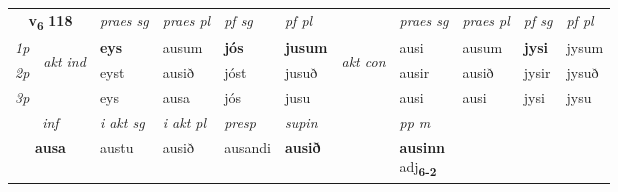 \noindent
\begin{tabular}{lllllllllll} \toprule
\multicolumn{2}{c}{\textbf{v{\textsubscript{6}}} \Large{\textbf{118}}}  &  \textit{praes sg}  & \textit{praes pl}  &\textit{ pf sg} & \textit{pf pl} &  &  \textit{praes sg}  & \textit{praes pl}  & \textit{pf sg} & \textit{pf pl } \\*
	\cmidrule{3-6} \cmidrule{8-11}
 {\textit{1p}} & \multirow{3}{*}{\begin{turn}{90}\textit{akt ind}\end{turn}} & \textbf{eys} & ausum & \textbf{jós} & \textbf{jusum} & \multirow{3}{*}{\begin{turn}{90}\textit{akt con}\end{turn}} &ausi & ausum & \textbf{jysi} & jysum\\*
 {\textit{2p}} &  &  eyst  & ausið & jóst & jusuð & & ausir & ausið & jysir & jysuð \\*
{\textit{3p}} &  & eys & ausa & jós & jusu & & ausi & ausi& jysi & jysu \\*
\cmidrule{3-6} \cmidrule{8-11}

   \multicolumn{2}{c}{\textit{inf}}  & \textit{i akt sg} & \textit{i akt pl}   & \textit{presp} & \textit{supin}  && \textit{pp m} \\*
  \multicolumn{2}{c}{\textbf{ausa}} & austu  & ausið   & ausandi &  \textbf{ausið}  && \specialcell{\textbf{ausinn} \\ adj\textbf{\textsubscript{6-2}}} \\*
\end{tabular}

